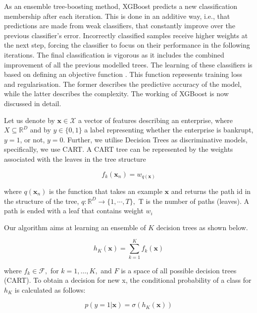 As an ensemble tree-boosting method, XGBoost predicts a new classification membership after each iteration. This is done in an additive way, i.e., that predictions are made from weak classifiers, that constantly improve over the previous classifier's error. Incorrectly classified samples receive higher weights at the next step, forcing the classifier to focus on their performance in the following iterations. The final classification is vigorous as it includes the combined improvement of all the previous modelled trees. The learning of these classifiers is based on defining an objective function \cite{chen2015xgboost}. This function represents training loss and regularisation. The former describes the predictive accuracy of the model, while the latter describes the complexity. The working of XGBoost is now discussed in detail.

Let us denote by $\mathbf{x} \in \mathscr{X}$ a vector of features describing an enterprise, where $X \subseteq \mathbb{R}^{D}$ and by $y \in\{0,1\}$ a label representing whether the enterprise is bankrupt, $y=1$, or not, $y=0$. Further, we utilise Decision Trees as discriminative models, specifically, we use CART. A CART tree can be represented by the weights associated with the leaves in the tree structure

\begin{equation}
f_{k}\left(\mathbf{x}_{n}\right)=w_{q(\mathbf{x})}
\end{equation}

where $q\left(\mathbf{x}_{n}\right)$ is the function that takes an example $\mathbf{x}$ and returns the path id in the structure of the tree, $q: \mathbb{R}^{D} \rightarrow\{1, \cdots, T\},$ T is the number of paths (leaves). A path is ended with a leaf that contains weight $w_{i}$

Our algorithm aims at learning an ensemble of $K$ decision trees \cite{chen2015xgboost} as shown below.

\begin{equation}
h_{K}(\mathbf{x})=\sum_{k=1}^{K} f_{k}(\mathbf{x})
\end{equation}

where $f_{k} \in \mathscr{F},$ for $k=1, \dots, K,$ and $F$ is a space of all possible decision trees (CART). To obtain a decision for new x, the conditional probability of a class for $h_K$ is calculated as follows:

\begin{equation}
p(y=1 | \mathbf{x})=\sigma\left(h_{K}(\mathbf{x})\right)
\end{equation}

